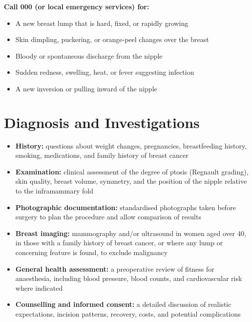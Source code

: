 \textbf{Call 000 (or local emergency services) for:}
\begin{itemize}
    \item A new breast lump that is hard, fixed, or rapidly growing
    \item Skin dimpling, puckering, or orange-peel changes over the breast
    \item Bloody or spontaneous discharge from the nipple
    \item Sudden redness, swelling, heat, or fever suggesting infection
    \item A new inversion or pulling inward of the nipple
\end{itemize}

\section*{Diagnosis and Investigations}
\begin{itemize}
    \item \textbf{History:} questions about weight changes, pregnancies, breastfeeding history, smoking, medications, and family history of breast cancer
    \item \textbf{Examination:} clinical assessment of the degree of ptosis (Regnault grading), skin quality, breast volume, symmetry, and the position of the nipple relative to the inframammary fold
    \item \textbf{Photographic documentation:} standardised photographs taken before surgery to plan the procedure and allow comparison of results
    \item \textbf{Breast imaging:} mammography and/or ultrasound in women aged over 40, in those with a family history of breast cancer, or where any lump or concerning feature is found, to exclude malignancy
    \item \textbf{General health assessment:} a preoperative review of fitness for anaesthesia, including blood pressure, blood counts, and cardiovascular risk where indicated
    \item \textbf{Counselling and informed consent:} a detailed discussion of realistic expectations, incision patterns, recovery, costs, and potential complications
\end{itemize}

